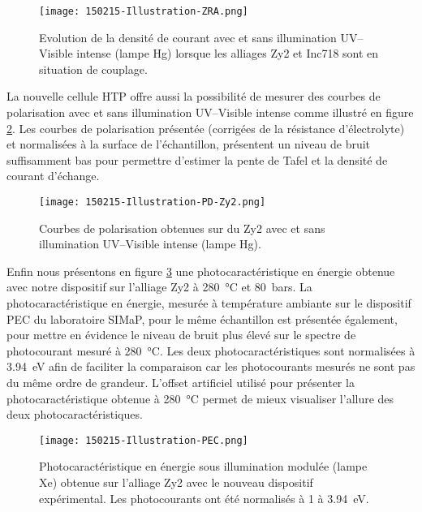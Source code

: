 \begin{refsection}
    \begin{figure}[H]
        \centering
            \texttt{[image: 150215-Illustration-ZRA.png]}
            \caption{Evolution de la densité de courant avec et sans illumination UV--Visible intense (lampe Hg) lorsque les
            alliages Zy2 et Inc718 sont en situation de couplage.}
            \label{fig:ch3_illustration_ZRA}
    \end{figure}

    La nouvelle cellule HTP offre aussi la possibilité de mesurer des courbes de polarisation avec et sans
    illumination UV--Visible intense comme illustré en figure \ref{fig:ch3_illustration_polarization_curve}.
    Les courbes de polarisation présentée (corrigées de la résistance d'électrolyte) et normalisées à la surface
    de l'échantillon,
    présentent un niveau de bruit suffisamment bas pour permettre d'estimer la pente de Tafel et la densité de courant d'échange.
     
    \begin{figure}[H]
        \centering
            \texttt{[image: 150215-Illustration-PD-Zy2.png]}
            \caption{Courbes de polarisation obtenues sur du Zy2 avec et sans illumination UV--Visible intense (lampe Hg).}
            \label{fig:ch3_illustration_polarization_curve}
    \end{figure}        

    Enfin nous présentons en figure \ref{fig:ch3_ht_pec_example} une photocaractéristique en énergie obtenue avec notre
    dispositif sur l'alliage Zy2 à \SI{280}{\degreeCelsius} et \SI{80}{bars}. 
    La photocaractéristique en énergie, mesurée à température ambiante
    sur le dispositif PEC du laboratoire SIMaP, pour le même échantillon est présentée également, pour mettre en évidence
    le niveau de bruit plus élevé sur le spectre de 
    photocourant mesuré à \SI{280}{\degreeCelsius}. Les deux photocaractéristiques sont normalisées à
    \SI{3.94}{\electronvolt} afin de faciliter la comparaison car les photocourants mesurés ne sont 
    pas du même ordre de grandeur. L'offset artificiel utilisé pour présenter la photocaractéristique obtenue à \SI{280}{\degreeCelsius} permet de
    mieux visualiser l'allure des deux photocaractéristiques.

    \begin{figure}[H]
        \centering
        \texttt{[image: 150215-Illustration-PEC.png]}
        \caption{Photocaractéristique en énergie sous illumination modulée (lampe Xe) obtenue sur l'alliage Zy2 avec le
        nouveau dispositif expérimental. Les photocourants ont été normalisés à 1 à 3.94~eV.}
        \label{fig:ch3_ht_pec_example}
    \end{figure}


\end{refsection}
